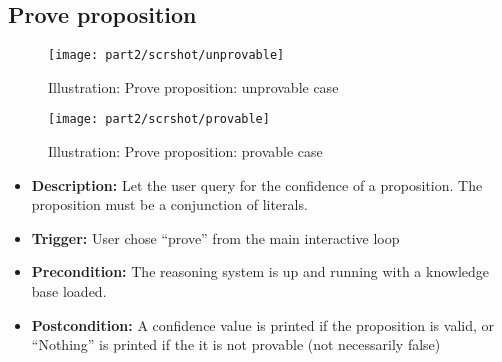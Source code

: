 \documentclass[../gr-final.tex]{subfiles}
\begin{document}
\subsection{Prove proposition}
\begin{figure}[H]
  \centering
  \texttt{[image: part2/scrshot/unprovable]}
  \caption{Illustration: Prove proposition: unprovable case}
\end{figure}
\begin{figure}[H]
  \centering
  \texttt{[image: part2/scrshot/provable]}
  \caption{Illustration: Prove proposition: provable case}
\end{figure}
\begin{itemize}
  \item {\bfseries Description:} Let the user query for the
    confidence of a proposition. The proposition must be a
    conjunction of literals.   
  \item {\bfseries Trigger:} User chose ``prove'' from the main
    interactive loop
  \item {\bfseries Precondition:} The reasoning system is up and
    running with a knowledge base loaded.
    
  \item {\bfseries Postcondition:} A confidence value is printed
    if the proposition is valid, or ``Nothing'' is printed if the
    it is not provable (not necessarily false)


\end{itemize}
\end{document}
